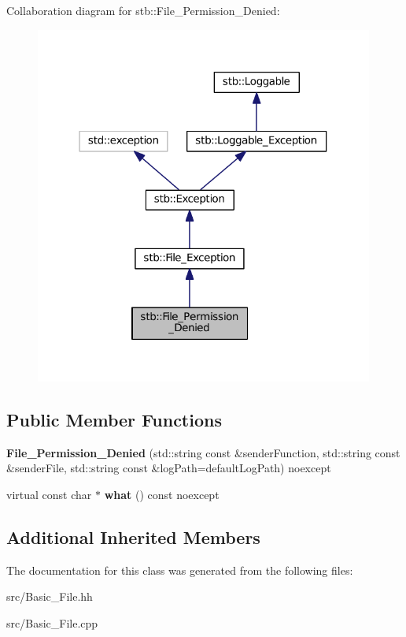 Collaboration diagram for stb\+:\+:File\+\_\+\+Permission\+\_\+\+Denied\+:
\nopagebreak
\begin{figure}[H]
\begin{center}
\leavevmode
\includegraphics[width=316pt]{classstb_1_1File__Permission__Denied__coll__graph}
\end{center}
\end{figure}
\subsection*{Public Member Functions}
\begin{DoxyCompactItemize}
\item 
\hypertarget{classstb_1_1File__Permission__Denied_ad6cc7a615218256406e98758cbff01ce}{{\bfseries File\+\_\+\+Permission\+\_\+\+Denied} (std\+::string const \&sender\+Function, std\+::string const \&sender\+File, std\+::string const \&log\+Path=default\+Log\+Path) noexcept}\label{classstb_1_1File__Permission__Denied_ad6cc7a615218256406e98758cbff01ce}

\item 
\hypertarget{classstb_1_1File__Permission__Denied_a3e03aca0e4567fc2f9a49bf6e3ba08f3}{virtual const char $\ast$ {\bfseries what} () const noexcept}\label{classstb_1_1File__Permission__Denied_a3e03aca0e4567fc2f9a49bf6e3ba08f3}

\end{DoxyCompactItemize}
\subsection*{Additional Inherited Members}


The documentation for this class was generated from the following files\+:\begin{DoxyCompactItemize}
\item 
src/Basic\+\_\+\+File.\+hh\item 
src/Basic\+\_\+\+File.\+cpp\end{DoxyCompactItemize}
